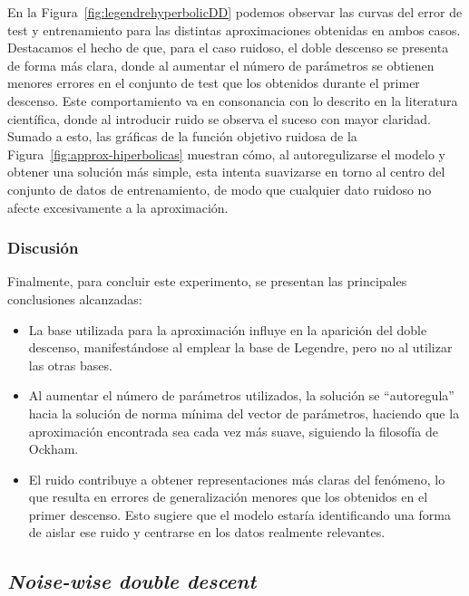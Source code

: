 En la Figura~\ref{fig:legendrehyperbolicDD} podemos observar las curvas del error de test y entrenamiento para las distintas aproximaciones obtenidas en ambos casos. Destacamos el hecho de que, para el caso ruidoso, el doble descenso se presenta de forma más clara, donde al aumentar el número de parámetros se obtienen menores errores en el conjunto de test que los obtenidos durante el primer descenso. Este comportamiento va en consonancia con lo descrito en la literatura científica, donde al introducir ruido se observa el suceso con mayor claridad. Sumado a esto, las gráficas de la función objetivo ruidosa de la Figura~\ref{fig:approx-hiperbolicas} muestran cómo, al autoregulizarse el modelo y obtener una solución más simple, esta intenta suavizarse en torno al centro del conjunto de datos de entrenamiento, de modo que cualquier dato ruidoso no afecte excesivamente a la aproximación.

\subsubsection{Discusión}\label{subsubsec:discusion-polinomico}

Finalmente, para concluir este experimento, se presentan las principales conclusiones alcanzadas:

\begin{itemize}
    \item La base utilizada para la aproximación influye en la aparición del doble descenso, manifestándose al emplear la base de Legendre, pero no al utilizar las otras bases.
    \item Al aumentar el número de parámetros utilizados, la solución se ``autoregula'' hacia la solución de norma mínima del vector de parámetros, haciendo que la aproximación encontrada sea cada vez más suave, siguiendo la filosofía de Ockham.
    \item El ruido contribuye a obtener representaciones más claras del fenómeno, lo que resulta en errores de generalización menores que los obtenidos en el primer descenso. Esto sugiere que el modelo estaría identificando una forma de aislar ese ruido y centrarse en los datos realmente relevantes.
\end{itemize}

\subsection{\textit{Noise-wise double descent}}\label{subsec:noise-wise-dd}

